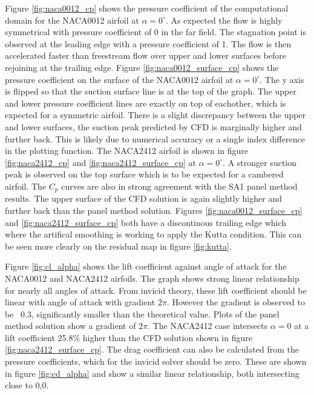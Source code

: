\documentclass{article}
\begin{document}
Figure \ref{fig:naca0012_cp} shows the pressure coefficient of the computational domain for the NACA0012 airfoil at $\alpha = 0^\circ$.
As expected the flow is highly symmetrical with pressure coefficient of 0 in the far field. The stagnation point is observed at the leading edge with a pressure coefficient of 1.
The flow is then accelerated faster than freestream flow over upper and lower surfaces before rejoining at the trailing edge.
Figure \ref{fig:naca0012_surface_cp} shows the pressure coefficient on the surface of the NACA0012 airfoil at $\alpha = 0^\circ$.
The y axis is flipped so that the suction surface line is at the top of the graph.
The upper and lower pressure coefficient lines are exactly on top of eachother, which is expected for a symmetric airfoil.
There is a slight discrepancy between the upper and lower surfaces, the suction peak predicted by CFD is marginally higher and further back.
This is likely due to numerical accuracy or a single index difference in the plotting function.
The NACA2412 airfoil is shown in figure \ref{fig:naca2412_cp} and \ref{fig:naca2412_surface_cp} at $\alpha = 0^\circ$.
A stronger suction peak is observed on the top surface which is to be expected for a cambered airfoil.
The $C_p$ curves are also in strong agreement with the SA1 panel method results.
The upper surface of the CFD solution is again slightly higher and further back than the panel method solution.
Figures \ref{fig:naca0012_surface_cp} and \ref{fig:naca2412_surface_cp} both have a discontinous trailing edge which where the artifical smoothing 
is working to apply the Kutta condition. This can be seen more clearly on the residual map in figure \ref{fig:kutta}.

Figure \ref{fig:cl_alpha} shows the lift coefficient against angle of attack for the NACA0012 and NACA2412 airfoils.
The graph shows strong linear relationship for nearly all angles of attack.
From invicid theory, these lift coefficient should be linear with angle of attack with gradient $ 2\pi $.
However the gradient is observed to be ~0.3, significantly smaller than the theoretical value.
Plots of the panel method solution show a gradient of $2\pi$. The NACA2412 case intersects $\alpha = 0$ at a lift coefficient 25.8\% higher than the CFD solution shown in figure \ref{fig:naca2412_surface_cp}.
The drag coefficient can also be calculated from the pressure coefficients, which for the invicid solver should be zero.
These are shown in figure \ref{fig:cd_alpha} and show a similar linear relationship, both intersecting close to 0,0.
\end{document}
